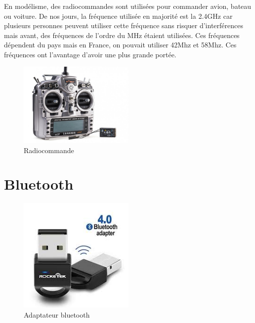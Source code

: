 \documentclass[a4paper, 11pt]{report}
\begin{document}
En modélisme, des radiocommandes sont utilisées pour commander avion, bateau ou voiture. De nos jours, la fréquence utilisée en majorité est la 2.4GHz car plusieurs personnes peuvent utiliser cette fréquence sans risquer d'interférences mais avant, des fréquences de l'ordre du MHz étaient utilisées. Ces fréquences dépendent du pays mais en France, on pouvait utiliser 42Mhz et 58Mhz. Ces fréquences ont l'avantage d'avoir une plus grande portée.

\begin{figure}[h]
\begin{centering}
\includegraphics[width=0.5\textwidth]{images/taranis.jpg}
\caption{Radiocommande}
\par\end{centering}
\end{figure}

\section{Bluetooth}

\begin{figure}[h]
\begin{centering}
\includegraphics[width=0.5\textwidth]{images/dongleBluetooth.jpeg}
\caption{Adaptateur bluetooth}
\par\end{centering}
\end{figure}
\end{document}
